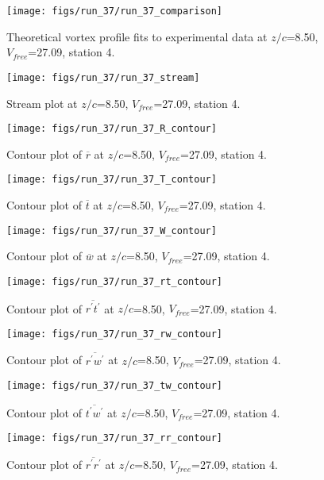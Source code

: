 \begin{figure}[H]
\centering
\texttt{[image: figs/run\_37/run\_37\_comparison]}
\caption{Theoretical vortex profile fits to experimental data at $z/c$=8.50, $V_{free}$=27.09, station 4.}
\end{figure}


\begin{figure}[H]
\centering
\texttt{[image: figs/run\_37/run\_37\_stream]}
\caption{Stream plot at $z/c$=8.50, $V_{free}$=27.09, station 4.}
\end{figure}


\begin{figure}[H]
\centering
\texttt{[image: figs/run\_37/run\_37\_R\_contour]}
\caption{Contour plot of $\overline{r}$ at $z/c$=8.50, $V_{free}$=27.09, station 4.}
\end{figure}


\begin{figure}[H]
\centering
\texttt{[image: figs/run\_37/run\_37\_T\_contour]}
\caption{Contour plot of $\overline{t}$ at $z/c$=8.50, $V_{free}$=27.09, station 4.}
\end{figure}


\begin{figure}[H]
\centering
\texttt{[image: figs/run\_37/run\_37\_W\_contour]}
\caption{Contour plot of $\overline{w}$ at $z/c$=8.50, $V_{free}$=27.09, station 4.}
\end{figure}


\begin{figure}[H]
\centering
\texttt{[image: figs/run\_37/run\_37\_rt\_contour]}
\caption{Contour plot of $\overline{r^\prime t^\prime}$ at $z/c$=8.50, $V_{free}$=27.09, station 4.}
\end{figure}


\begin{figure}[H]
\centering
\texttt{[image: figs/run\_37/run\_37\_rw\_contour]}
\caption{Contour plot of $\overline{r^\prime w^\prime}$ at $z/c$=8.50, $V_{free}$=27.09, station 4.}
\end{figure}


\begin{figure}[H]
\centering
\texttt{[image: figs/run\_37/run\_37\_tw\_contour]}
\caption{Contour plot of $\overline{t^\prime w^\prime}$ at $z/c$=8.50, $V_{free}$=27.09, station 4.}
\end{figure}


\begin{figure}[H]
\centering
\texttt{[image: figs/run\_37/run\_37\_rr\_contour]}
\caption{Contour plot of $\overline{r^\prime r^\prime}$ at $z/c$=8.50, $V_{free}$=27.09, station 4.}
\end{figure}


